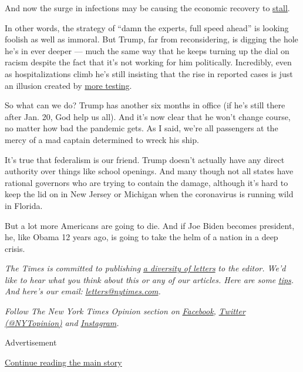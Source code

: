 And now the surge in infections may be causing the economic recovery to
\href{https://www.wsj.com/articles/new-coronavirus-surges-stall-economic-recovery-11594209321}{stall}.

In other words, the strategy of ``damn the experts, full speed ahead''
is looking foolish as well as immoral. But Trump, far from
reconsidering, is digging the hole he's in ever deeper --- much the same
way that he keeps turning up the dial on racism despite the fact that
it's not working for him politically. Incredibly, even as
hospitalizations climb he's still insisting that the rise in reported
cases is just an illusion created by
\href{https://twitter.com/GarrettHaake/status/1281209237281046529}{more
testing}.

So what can we do? Trump has another six months in office (if he's still
there after Jan. 20, God help us all). And it's now clear that he won't
change course, no matter how bad the pandemic gets. As I said, we're all
passengers at the mercy of a mad captain determined to wreck his ship.

It's true that federalism is our friend. Trump doesn't actually have any
direct authority over things like school openings. And many though not
all states have rational governors who are trying to contain the damage,
although it's hard to keep the lid on in New Jersey or Michigan when the
coronavirus is running wild in Florida.

But a lot more Americans are going to die. And if Joe Biden becomes
president, he, like Obama 12 years ago, is going to take the helm of a
nation in a deep crisis.

\emph{The Times is committed to publishing}
\href{https://www.nytimes.com/2019/01/31/opinion/letters/letters-to-editor-new-york-times-women.html}{\emph{a
diversity of letters}} \emph{to the editor. We'd like to hear what you
think about this or any of our articles. Here are some}
\href{https://help.nytimes.com/hc/en-us/articles/115014925288-How-to-submit-a-letter-to-the-editor}{\emph{tips}}\emph{.
And here's our email:}
\href{mailto:letters@nytimes.com}{\emph{letters@nytimes.com}}\emph{.}

\emph{Follow The New York Times Opinion section on}
\href{https://www.facebook.com/nytopinion}{\emph{Facebook}}\emph{,}
\href{http://twitter.com/NYTOpinion}{\emph{Twitter (@NYTopinion)}}
\emph{and}
\href{https://www.instagram.com/nytopinion/}{\emph{Instagram}}\emph{.}

Advertisement

\protect\hyperlink{after-bottom}{Continue reading the main story}

